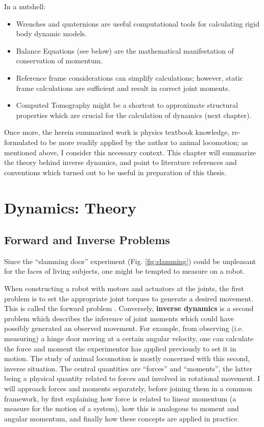 In a nutshell:
\begin{itemize}
\item Wrenches and quaternions are useful computational tools for calculating rigid body dynamic models.
\item Balance Equations (see below) are the mathematical manifestation of conservation of momentum.
\item Reference frame considerations can simplify calculations; however, static frame calculations are sufficient and result in correct joint moments.
\end{itemize}

\begin{itemize}
\item Computed Tomography might be a shortcut to approximate structural properties which are crucial for the calculation of dynamics (next chapter).
\end{itemize}


Once more, the herein summarized work is physics textbook knowledge, re-formulated to be more readily applied by the author to animal locomotion; as mentioned above, I consider this necessary context.
This chapter will summarize the theory behind inverse dynamics, and point to literature references and conventions which turned out to be useful in preparation of this thesis.


\section{Dynamics: Theory}
\label{sec:orga2611b0}
\subsection{Forward and Inverse Problems}
\label{sec:org85e81af}
Since the ``slamming door'' experiment (Fig. \ref{fig:slamming}) could be unpleasant for the faces of living subjects, one might be tempted to measure on a robot.

When constructing a robot with motors and actuators at the joints, the first problem is to set the appropriate joint torques to generate a desired movement.
This is called the forward problem \citep{Lynch2017}.
Conversely, \textbf{inverse dynamics} is a second problem which describes the inference of joint moments which could have possibly generated an observed movement.
For example, from observing (i.e. measuring) a hinge door moving at a certain angular velocity, one can calculate the force and moment the experimentor has applied previously to set it in motion.
The study of animal locomotion is mostly concerned with this second, inverse situation.
The central quantities are ``forces'' and ``moments'', the latter being a physical quantity related to forces and involved in rotational movement.
I will approach forces and moments separately, before joining them in a common framework, by first explaining how force is related to linear momentum (a measure for the motion of a system), how this is analogous to moment and angular momentum, and finally how these concepts are applied in practice.


